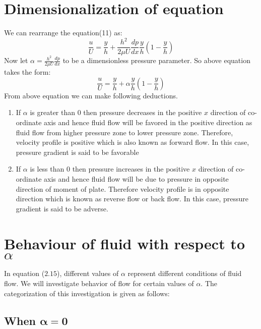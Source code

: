 \documentclass[14pt,one side, a4paper]{extbook}
\begin{document}
	 	\section{Dimensionalization of equation}
	 	 We can rearrange the equation(11) as:
	 	\begin{equation}
	 		\frac{u}{U}=\frac{y}{h}+\frac{h^{2}}{2\mu{U}}\frac{dp}{dx}\frac{y}{h}\left(1-\frac{y}{h}\right)
	 	\end{equation}
	 	Now let $\alpha=\frac{h^{2}}{2\mu {U}}\frac{dp}{dx}$ to be a dimensionless pressure parameter.
	 	So above equation takes the form:
	 	\begin{equation}
	 		\frac{u}{U}=\frac{y}{h}+\alpha\frac{y}{h}\left(1-\frac{y}{h}\right)
	 	\end{equation} 
	 	From above equation we can make following deductions. 
	 	\begin{enumerate}
	 		\item {	If $\alpha$ is greater than $0$ then pressure decreases in the positive $x$ direction of co-ordinate axis and hence fluid flow will be favored in the positive direction as fluid flow from higher pressure zone to lower pressure zone.
	 			Therefore, velocity profile is positive which is also known as forward flow. In this case, pressure gradient is said to be favorable}
	 		\item {If $\alpha$ is less than $0$ then pressure increases in the positive $x$ direction of co-ordinate axis and hence fluid flow will be due to pressure in opposite direction of moment of plate.
	 			Therefore velocity profile is in opposite direction which is known as reverse flow or back flow. In this case, pressure gradient is said to be adverse.}
	 	\end{enumerate}
	 	
	 	
	 	
	 	\section{Behaviour of fluid with respect to $\alpha$} 
	 	In equation ($2.15$), different values of $\alpha$ represent different conditions of fluid flow. We will investigate behavior of flow for certain values of $\alpha$.
	 	The categorization of this investigation is given as follows: 
	 	
	 	\subsection{When $\mathbf{\alpha=0}$}
	 	
\end{document}
